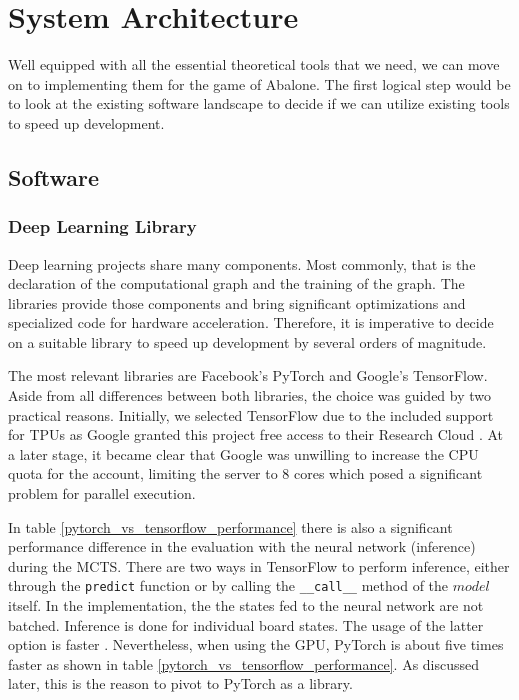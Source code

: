 \chapter{System Architecture}
\label{system-architecture}
Well equipped with all the essential theoretical tools that we need, we can move on to implementing them for the game of Abalone. The first logical step would be to look at the existing software landscape to decide if we can utilize existing tools to speed up development.

\section{Software}
\subsection{Deep Learning Library}
Deep learning projects share many components. Most commonly, that is the declaration of the computational graph and the training of the graph. The libraries provide those components and bring significant optimizations and specialized code for hardware acceleration. Therefore, it is imperative to decide on a suitable library to speed up development by several orders of magnitude.

The most relevant libraries are Facebook's PyTorch and Google's TensorFlow.  Aside from all differences between both libraries, the choice was guided by two practical reasons. Initially, we selected TensorFlow due to the included support for TPUs as Google granted this project free access to their Research Cloud \cite{noauthor_tpu_nodate}. At a later stage, it became clear that Google was unwilling to increase the CPU quota for the account, limiting the server to 8 cores which posed a significant problem for parallel execution.

In table \ref{pytorch_vs_tensorflow_performance} there is also a significant performance difference in the evaluation with the neural network (inference) during the MCTS. There are two ways in TensorFlow to perform inference, either through the \texttt{predict} function or by calling the \texttt{\_\_call\_\_} method of the $model$ itself. In the implementation, the  the states fed to the neural network are not batched. Inference is done for individual board states. The usage of the latter option is faster \cite{noauthor_tfkerasmodel_nodate}. Nevertheless, when using the GPU, PyTorch is about five times faster as shown in table \ref{pytorch_vs_tensorflow_performance}. As discussed later, this is the reason to pivot to PyTorch as a library.

